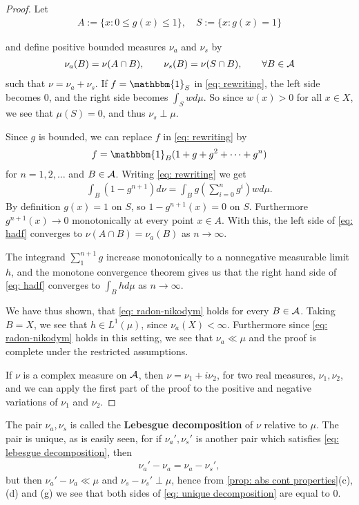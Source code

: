 \begin{proof}
Let
\begin{align*}
	A:=\{x:0\le g(x) \le 1\}, \quad S:=\{x: g(x)=1 \}
\end{align*}

and define positive bounded measures $\nu_{a}$ and $\nu_{s}$ by
\begin{align*}
	\nu_{a}(B)=\nu(A\cap B), \qquad \nu_{s}(B)=\nu(S\cap B), \qquad \forall B\in \mathcal{A}
\end{align*}
such that $\nu=\nu_{a}+\nu_{s}$.
If $f=\mathbbm{1}_{S}$ in \eqref{eq: rewriting}, the left side becomes $0$, and the right side becomes $\int_{S}wd\mu$. So since $w(x)>0$ for all $x\in X$, we see that $\mu(S)=0$, and thus $\nu_{s} \perp \mu$.

Since $g$ is bounded, we can replace $f$ in \eqref{eq: rewriting} by
\begin{align*}
	f=\mathbbm{1}_{B}(1+g+g^{2}+\dots+g^{n})
\end{align*}
for $n=1,2, \dots$ and $B\in \mathcal{A}$. Writing \eqref{eq: rewriting} we get
\begin{align}
	\int_{B}(1-g^{n+1})d\nu = \int_{B}g\left(\sum_{i=0}^{n}g^{i}\right)wd\mu. \label{eq: hadf}
\end{align}
By definition $g(x)=1$ on $S$, so $1-g^{n+1}(x)=0$ on $S$. Furthermore $g^{n+1}(x)\to 0$ monotonically at every point $x\in A$. With this, the left side of \eqref{eq: hadf} converges to $\nu(A\cap B)=\nu_{a}(B)$ as $n\to \infty$.

The integrand $\sum_{1}^{n+1}g$ increase monotonically to a nonnegative measurable limit $h$, and the monotone convergence theorem gives us that the right hand side of \eqref{eq: hadf} converges to $\int_{B}hd\mu$ as $n\to \infty$.

We have thus shown, that \eqref{eq: radon-nikodym} holds for every $B\in \mathcal{A}$. Taking $B=X$, we see that $h\in L^{1}(\mu)$, since $\nu_{a}(X)<\infty$. Furthermore since \eqref{eq: radon-nikodym} holds in this setting, we see that $\nu_{a}\ll \mu$ and the proof is complete under the restricted assumptions.

If $\nu$ is a complex measure on $\mathcal{A}$, then $\nu=\nu_{1}+i\nu_{2}$, for two real measures, $\nu_{1}, \nu_{2}$, and we can apply the first part of the proof to the positive and negative variations of $\nu_{1}$ and $\nu_{2}$. %
\end{proof}



The pair $\nu_{a}, \nu_{s}$ is called the \textbf{Lebesgue decomposition} of $\nu$ relative to $\mu$. The pair is unique, as is easily seen, for if $\nu_{a}',\nu_{s}'$ is another pair which satisfies \eqref{eq: lebesgue decomposition}, then
\begin{align}
	\nu_{a}'-\nu_{a}=\nu_{a}-\nu_{s}', \label{eq: unique decomposition}
\end{align}
but then $\nu_{a}'-\nu_{a}\ll \mu$ and $\nu_{s}-\nu_{s}'\perp \mu$, hence from \cref{prop: abs cont properties}(c), (d) and (g) we see that both sides of \eqref{eq: unique decomposition} are equal to 0.

